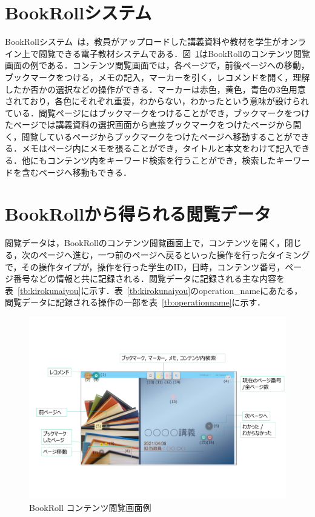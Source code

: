 \documentclass[a4paper,12pt]{ltjsreport}
\begin{document}
\section{BookRollシステム}\label{sec:bookroll}
BookRollシステム~\cite{BookRoll}は，教員がアップロードした講義資料や教材を学生がオンライン上で閲覧できる電子教材システムである．図~\ref{fig:gamen}はBookRollのコンテンツ閲覧画面の例である．コンテンツ閲覧画面では，各ページで，前後ページへの移動，ブックマークをつける，メモの記入，マーカーを引く，レコメンドを開く，理解したか否かの選択などの操作ができる．マーカーは赤色，黄色，青色の3色用意されており，各色にそれぞれ重要，わからない，わかったという意味が設けられている．閲覧ページにはブックマークをつけることができ，ブックマークをつけたページでは講義資料の選択画面から直接ブックマークをつけたページから開く，閲覧しているページからブックマークをつけたページへ移動することができる．メモはページ内にメモを張ることができ，タイトルと本文をわけて記入できる．他にもコンテンツ内をキーワード検索を行うことができ，検索したキーワードを含むページへ移動もできる．

\section{BookRollから得られる閲覧データ}\label{sec:esturandata}

閲覧データは，BookRollのコンテンツ閲覧画面上で，コンテンツを開く，閉じる，次のページへ進む，一つ前のページへ戻るといった操作を行ったタイミングで，その操作タイプが，操作を行った学生のID，日時，コンテンツ番号，ページ番号などの情報と共に記録される．閲覧データに記録される主な内容を表~\ref{tb:kirokunaiyou}に示す．表~\ref{tb:kirokunaiyou}のoperation\_nameにあたる，閲覧データに記録される操作の一部を表~\ref{tb:operationname}に示す．


\begin{figure}[tbp]
  \centering
  \includegraphics[scale = 0.4]{BookRoll.pdf}
  \vspace{-10mm}
  \caption{BookRoll コンテンツ閲覧画面例~\cite{BookRollgamen}}
  \label{fig:gamen}
\end{figure}
\end{document}

